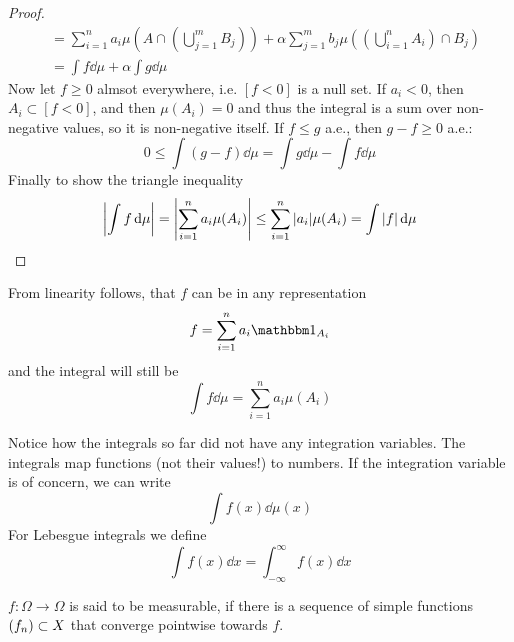 \documentclass[../../script.tex]{subfiles}
\begin{document}
\begin{proof}
\begin{align*}
        &= \sum_{i=1}^n a_i \mu\left(A \cap \left(\bigcup_{j=1}^m B_j\right)\right) + \alpha \sum_{j=1}^m b_j \mu\left(\left(\bigcup_{i=1}^n A_i\right) \cap B_j \right) \\
        &= \int f \dd{\mu} + \alpha \int g \dd{\mu}
    \end{align*}
    Now let $f \ge 0$ almsot everywhere, i.e. $[f < 0]$ is a null set. If $a_i < 0$, then $A_i \subset [f < 0]$, and then $\mu(A_i) = 0$ 
    and thus the integral is a sum over non-negative values, so it is non-negative itself.
    If $f \le g$ a.e., then $g - f \ge 0$ a.e.:
    \begin{equation}
        0 \le \int (g - f) \dd{\mu} = \int g \dd{\mu} - \int f \dd{\mu} 
    \end{equation}
    Finally to show the triangle inequality
    \begin{equation}
        \abs{\int f \dd{\mu}} = \abs{\sum_{i=1}^n a_i \mu(A_i)} \le \sum_{i=1}^n \abs{a_i} \mu(A_i) = \int \abs{f} \dd{\mu}
    \end{equation}
\end{proof}

\begin{rem}
    From linearity follows, that $f$ can be in any representation 
    \[
        f = \sum_{i=1}^n a_i \charfun_{A_i}
    \]
    and the integral will still be 
    \[
        \int f \dd{\mu} = \sum_{i=1}^n a_i \mu(A_i)
    \]
\end{rem}

\begin{rem}
    Notice how the integrals so far did not have any integration variables. The integrals map functions (not their values!) to numbers.
    If the integration variable is of concern, we can write 
    \[
        \int f(x) \dd{\mu(x)}
    \]
    For Lebesgue integrals we define 
    \[
        \int f(x) \dd{x} = \int_{-\infty}^{\infty} f(x) \dd{x}
    \]
\end{rem}

\begin{defi}
    $f: \Omega \rightarrow \Omega$ is said to be measurable, if there is a sequence of simple functions $\anyseqdef[f]{X}$ that converge pointwise towards $f$.
\end{defi}
\end{document}
